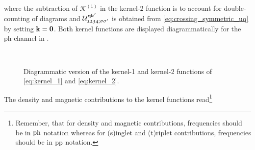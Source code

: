\documentclass[../../main.tex]{subfiles}
\begin{document}
where the subtraction of $\mathcal{K}^{(1)}$ in the kernel-2 function is to account for double-counting of diagrams and $\mathcal{U}^{\textbf{qk}'}_{\mathfrak{1234};\sigma\sigma'}$ is obtained from \eqref{eq:crossing_symmetric_uq} by setting $\textbf{k}=\textbf{0}$. Both kernel functions are displayed diagrammatically for the ph-channel in .
\begin{figure}[ht!]
  \centering
  \subfloat{}\\[0.5cm]
  \hspace{-0.25cm}\subfloat{}
  \caption{Diagrammatic version of the kernel-1 and kernel-2 functions of \eqref{eq:kernel_1} and \eqref{eq:kernel_2}.}
  \label{fig:kernel_functions}
\end{figure}
The density and magnetic contributions to the kernel functions read\footnote{Remember, that for density and magnetic contributions, frequencies should be in $\text{ph}$ notation whereas for (s)inglet and (t)riplet contributions, frequencies should be in $\text{pp}$ notation.}
\end{document}
